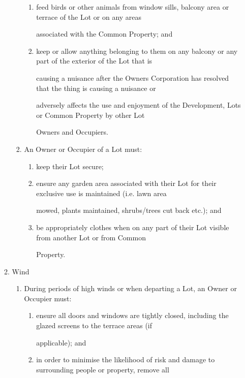 \documentclass{article}
\begin{document}
\begin{enumerate}[label=\arabic*.]
\begin{enumerate}[label=\arabic{enumi}.\arabic*.]
\begin{enumerate}[label=(\arabic*)]
\begin{enumerate}[label=(\alph*)]
\item  feed birds or other animals from window sills, balcony area or terrace of the Lot or on any areas 

associated with the Common Property; and 

\item  keep or allow anything belonging to them on any balcony or any part of the exterior of the Lot that is 

causing a nuisance after the Owners Corporation has resolved that the thing is causing a nuisance or 

adversely affects the use and enjoyment of the Development, Lots or Common Property by other Lot 

Owners and Occupiers. 

\end{enumerate}
\item  An Owner or Occupier of a Lot must: 

\begin{enumerate}[label=(\alph*)]
\item  keep their Lot secure; 

\item  ensure any garden area associated with their Lot for their exclusive use is maintained (i.e. lawn area 

mowed, plants maintained, shrubs/trees cut back etc.); and 

\item  be appropriately clothes when on any part of their Lot visible from another Lot or from Common 

Property. 

\end{enumerate}
\end{enumerate}
\item  Wind 

\begin{enumerate}[label=(\arabic*)]
\item  During periods of high winds or when departing a Lot, an Owner or Occupier must: 

\begin{enumerate}[label=(\alph*)]
\item  ensure all doors and windows are tightly closed, including the glazed screens to the terrace areas (if 

applicable); and 

\item  in order to minimise the likelihood of risk and damage to surrounding people or property, remove all 


\end{enumerate}
\end{enumerate}
\end{enumerate}
\end{enumerate}
\end{document}
